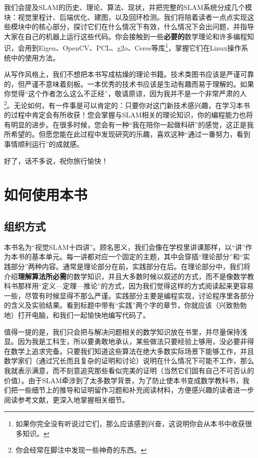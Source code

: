 我们会提及SLAM的历史、理论、算法、现状，并把完整的SLAM系统分成几个模块：视觉里程计、后端优化、建图，以及回环检测。我们将陪着读者一点点实现这些模块中的核心部分，探讨它们在什么情况下有效，什么情况下会出问题，并指导大家在自己的机器上运行这些代码。你会接触到一些\textbf{必要的}数学理论和许多编程知识，会用到Eigen、OpenCV、PCL、g2o、Ceres等库\footnote{如果你完全没有听说过它们，那么应该感到兴奋，这说明你会从本书中收获很多知识。}，掌握它们在Linux操作系统中的使用方法。

从写作风格上，我们不想把本书写成枯燥的理论书籍。技术类图书应该是严谨可靠的，但严谨不意味着刻板。一本优秀的技术书应该是生动有趣而易于理解的。如果你觉得“这个作者怎么这么不正经”，敬请原谅，因为我并不是一个非常严肃的人\footnote{你会经常在脚注中发现一些神奇的东西。}。无论如何，有一件事是可以肯定的：只要你对这门新技术感兴趣，在学习本书的过程中肯定会有所收获！您会掌握与SLAM相关的理论知识，你的编程能力也将有明显的进步。在很多时候，您会有一种“我在陪你一起做科研”的感觉，这正是我所希望的。但愿您能在此过程中发现研究的乐趣，喜欢这种“通过一番努力，看到事情顺利运行”的成就感。

好了，话不多说，祝你旅行愉快！

\section{如何使用本书}
\subsection{组织方式}
本书名为“视觉SLAM十四讲”。顾名思义，我们会像在学校里讲课那样，以“讲”作为本书的基本单元。每一讲都对应一个固定的主题，其中会穿插“理论部分”和“实践部分”两种内容。通常是理论部分在前，实践部分在后。在理论部分中，我们将介绍\textbf{理解算法所必需}的数学知识，并且大多数时候以叙述的方式，而不是像数学教科书那样用“定义—定理—推论”的方式，因为我们觉得这样的方式阅读起来更容易一些，尽管有时候显得不那么严谨。实践部分主要是编程实现，讨论程序里各部分的含义及实验结果。看到标题中带有“实践”两个字的章节，你就应该（兴致勃勃地）打开电脑，和我们一起愉快地编写代码了。

值得一提的是，我们只会把与解决问题相关的数学知识放在书里，并尽量保持浅显。因为我是工科生，所以要勇敢地承认，某些做法只要经验上够用，没必要非得在数学上追求完备。只要我们知道这些算法在绝大多数实际场景下能够工作，并且数学家们（通过冗长而且复杂的证明和讨论）说明在什么情况下可能不工作，那么我就表示满意，而不刻意追究那些看似完美的证明（当然它们固有自己不可否认的价值）。由于SLAM牵涉到了太多数学背景，为了防止使本书变成数学教科书，我们把一些细节上的推导和证明留作习题和补充阅读材料，方便感兴趣的读者进一步阅读参考文献，更深入地掌握相关细节。

